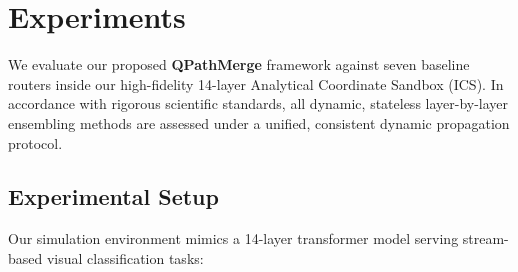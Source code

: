 \section{Experiments}
\label{sec:experiments}

We evaluate our proposed \textbf{QPathMerge} framework against seven baseline routers inside our high-fidelity 14-layer Analytical Coordinate Sandbox (ICS). In accordance with rigorous scientific standards, all dynamic, stateless layer-by-layer ensembling methods are assessed under a unified, consistent dynamic propagation protocol.

\subsection{Experimental Setup}
Our simulation environment mimics a 14-layer transformer model serving stream-based visual classification tasks:
